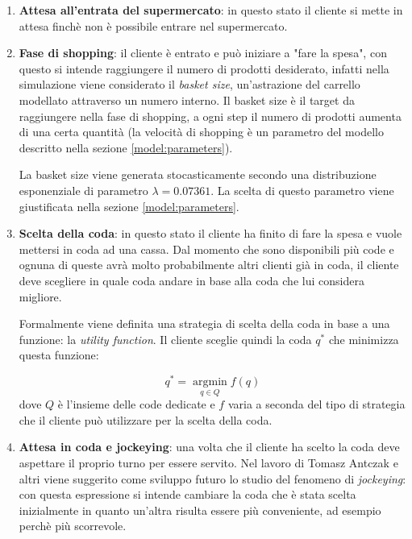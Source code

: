 \begin{enumerate}
	\item \textbf{Attesa all'entrata del supermercato}: in questo stato il cliente si mette in attesa finchè non è possibile entrare nel supermercato.
	\item \textbf{Fase di shopping}: il cliente è entrato e può iniziare a "fare la spesa", con questo si intende raggiungere il numero di prodotti desiderato, infatti nella simulazione viene considerato il \textit{basket size}, un'astrazione del carrello modellato attraverso un numero interno. Il basket size è il target da raggiungere nella fase di shopping, a ogni step il numero di prodotti aumenta di una certa quantità (la velocità di shopping è un parametro del modello descritto nella sezione \ref{model:parameters}). 
	
	La basket size viene generata stocasticamente secondo una distribuzione esponenziale di parametro $\lambda = 0.07361$. La scelta di questo parametro viene giustificata nella sezione \ref{model:parameters}. 
	
	\item \textbf{Scelta della coda}: in questo stato il cliente ha finito di fare la spesa e vuole mettersi in coda ad una cassa. Dal momento che sono disponibili più code e ognuna di queste avrà molto probabilmente altri clienti già in coda, il cliente deve scegliere in quale coda andare in base alla coda che lui considera migliore.
	
	Formalmente viene definita una strategia di scelta della coda in base a una funzione: la \textit{utility function}. Il cliente sceglie quindi la coda $q^*$ che minimizza questa funzione:

	\begin{equation}
		q^* = \operatorname*{argmin}_{q \in Q} f(q) \label{eq:strategy}
	\end{equation}
	dove $Q$ è l'insieme delle code dedicate e $f$ varia a seconda del tipo di strategia che il cliente può utilizzare per la scelta della coda.

	\item \textbf{Attesa in coda e jockeying}: una volta che il cliente ha scelto la coda deve aspettare il proprio turno per essere servito. Nel lavoro di Tomasz Antczak e altri \cite{article1} viene suggerito come sviluppo futuro lo studio del fenomeno di \textit{jockeying}: con questa espressione si intende cambiare la coda che è stata scelta inizialmente in quanto un'altra risulta essere più conveniente, ad esempio perchè più scorrevole.
	

\end{enumerate}
